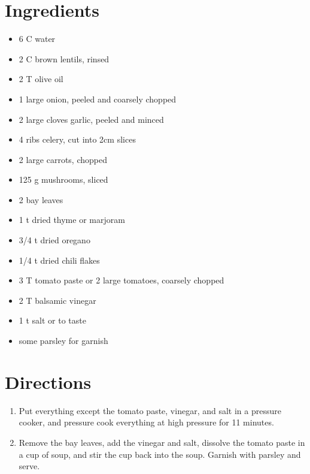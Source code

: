 \documentclass[letterpaper,10pt,english]{sphinxmanual}
\begin{document}
\section{Ingredients}
\label{italian_lentil_soup:ingredients}\begin{itemize}
\item {} 
6       C       water

\item {} 
2   C   brown lentils, rinsed

\item {} 
2   T   olive oil

\item {} 
1       large onion, peeled and coarsely chopped

\item {} 
2       large cloves garlic, peeled and minced

\item {} 
4       ribs celery, cut into 2cm slices

\item {} 
2       large carrots, chopped

\item {} 
125 g   mushrooms, sliced

\item {} 
2       bay leaves

\item {} 
1   t   dried thyme or marjoram

\item {} 
3/4 t   dried oregano

\item {} 
1/4 t   dried chili flakes

\item {} 
3   T   tomato paste or 2 large tomatoes, coarsely chopped

\item {} 
2   T   balsamic vinegar

\item {} 
1   t   salt or to taste

\item {} 
some        parsley for garnish

\end{itemize}


\section{Directions}
\label{italian_lentil_soup:directions}\begin{enumerate}
\item {} 
Put everything except the tomato paste, vinegar, and salt in a pressure cooker, and pressure cook everything at high pressure for 11 minutes.

\item {} 
Remove the bay leaves, add the vinegar and salt, dissolve the tomato paste in a cup of soup, and stir the cup back into the soup. Garnish with parsley and serve.

\end{enumerate}
\end{document}
